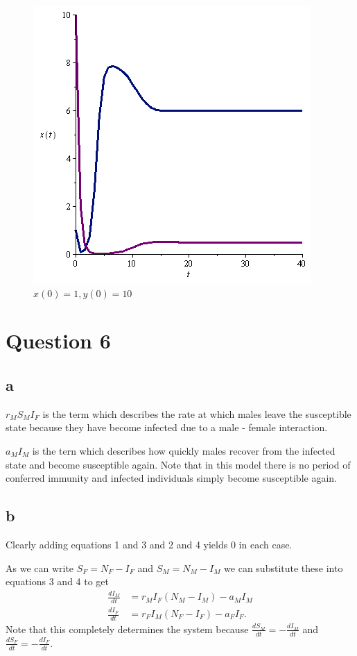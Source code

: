 \documentclass{unswmaths}
\begin{document}
\begin{figure}[H]
    \includegraphics[scale=0.5]{pp_1_10}
    \caption{$x(0)=1,y(0)=10$}
\end{figure}
\section*{Question 6}
\subsection*{a}
$ r_MS_MI_F $ is the term which describes the rate at which males leave the susceptible state because they have become infected due to a male - female interaction.

$ a_MI_M $ is the tern which describes how quickly males recover from the infected state and become susceptible again. Note that in this model there is no period of conferred immunity and infected individuals simply become susceptible again.

\subsection*{b}
Clearly adding equations 1 and 3 and 2 and 4 yields 0 in each case. 

As we can write $ S_F = N_F - I_F $ and $ S_M = N_M - I_M $ we can substitute these into equations 3 and 4 to get
\begin{align*}
    \frac{dI_M}{dt} &= r_MI_F(N_M-I_M)-a_MI_M \\
    \frac{dI_F}{dt} &= r_FI_M(N_F - I_F) - a_FI_F.
\end{align*}
Note that this completely determines the system because $ \frac{dS_M}{dt} = -\frac{dI_M}{dt} $ and  $ \frac{dS_F}{dt} = -\frac{dI_F}{dt} $.
\end{document}
